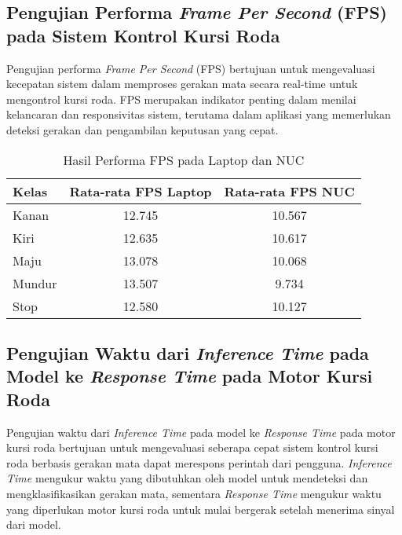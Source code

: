 \subsection{Pengujian Performa \emph{Frame Per Second} (FPS) pada Sistem Kontrol Kursi Roda}

Pengujian performa \emph{Frame Per Second} (FPS) bertujuan untuk mengevaluasi kecepatan sistem dalam memproses gerakan mata secara real-time untuk mengontrol kursi roda. FPS merupakan indikator penting dalam menilai kelancaran dan responsivitas sistem, terutama dalam aplikasi yang memerlukan deteksi gerakan dan pengambilan keputusan yang cepat.

\begin{table}[ht]
  \caption{Hasil Performa FPS pada Laptop dan NUC}
  \label{tb:fps}
  \centering
  \begin{tabular}{|l|c|c|}
  \hline
  \rowcolor[HTML]{C0C0C0} 
  \textbf{Kelas} & \textbf{Rata-rata FPS Laptop} & \textbf{Rata-rata FPS NUC} \\ \hline
  Kanan           & 12.745              & 10.567           \\ \hline
  Kiri           & 12.635              & 10.617            \\ \hline
  Maju           & 13.078              & 10.068           \\ \hline
  Mundur           & 13.507              & 9.734           \\ \hline
  Stop           & 12.580              & 10.127            \\ \hline
  \end{tabular}
\end{table}

\subsection{Pengujian Waktu dari \emph{Inference Time} pada Model ke \emph{Response Time} pada Motor Kursi Roda}

Pengujian waktu dari \emph{Inference Time} pada model ke \emph{Response Time} pada motor kursi roda bertujuan untuk mengevaluasi seberapa cepat sistem kontrol kursi roda berbasis gerakan mata dapat merespons perintah dari pengguna. \emph{Inference Time} mengukur waktu yang dibutuhkan oleh model untuk mendeteksi dan mengklasifikasikan gerakan mata, sementara \emph{Response Time} mengukur waktu yang diperlukan motor kursi roda untuk mulai bergerak setelah menerima sinyal dari model.

